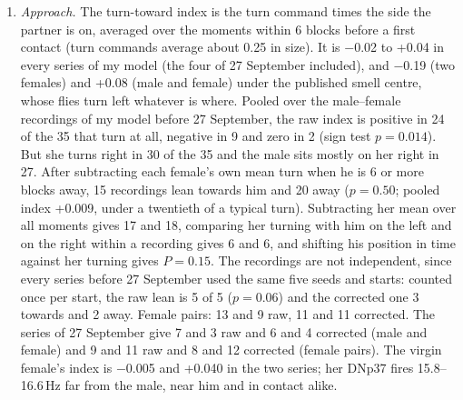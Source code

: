 \documentclass[11pt,a4paper]{article}
\begin{document}
\begin{enumerate}[leftmargin=*, label=\arabic*., itemsep=4pt]
\item \emph{Approach.} The turn-toward index is the turn command times the side the partner is on, averaged over the moments within 6 blocks before a first contact (turn commands average about 0.25 in size). It is $-$0.02 to +0.04 in every series of my model (the four of 27 September included), and $-$0.19 (two females) and +0.08 (male and female) under the published smell centre, whose flies turn left whatever is where. Pooled over the male--female recordings of my model before 27 September, the raw index is positive in 24 of the 35 that turn at all, negative in 9 and zero in 2 (sign test $p=0.014$). But she turns right in 30 of the 35 and the male sits mostly on her right in 27. After subtracting each female's own mean turn when he is 6 or more blocks away, 15 recordings lean towards him and 20 away ($p=0.50$; pooled index +0.009, under a twentieth of a typical turn). Subtracting her mean over all moments gives 17 and 18, comparing her turning with him on the left and on the right within a recording gives 6 and 6, and shifting his position in time against her turning gives $P=0.15$. The recordings are not independent, since every series before 27 September used the same five seeds and starts: counted once per start, the raw lean is 5 of 5 ($p=0.06$) and the corrected one 3 towards and 2 away. Female pairs: 13 and 9 raw, 11 and 11 corrected. The series of 27 September give 7 and 3 raw and 6 and 4 corrected (male and female) and 9 and 11 raw and 8 and 12 corrected (female pairs). The virgin female's index is $-$0.005 and +0.040 in the two series; her DNp37 fires 15.8--16.6\,Hz far from the male, near him and in contact alike.


\end{enumerate}
\end{document}
